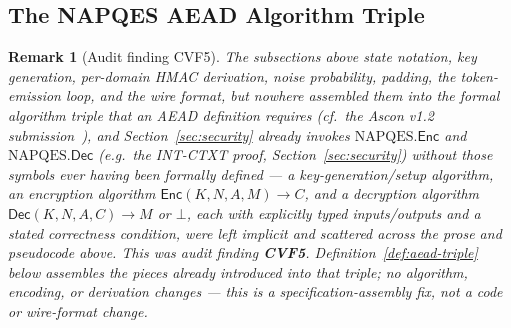 \documentclass[11pt,a4paper]{article}
\newtheorem{remark}[theorem]{Remark}
\begin{document}
\subsection{The NAPQES AEAD Algorithm Triple}
\label{sec:algorithm-triple}

\begin{remark}[Audit finding CVF5]
The subsections above state notation, key generation, per-domain HMAC
derivation, noise probability, padding, the token-emission loop, and the
wire format, but nowhere assembled them into the formal algorithm triple
that an AEAD definition requires (cf.\ the Ascon v1.2
submission~\cite{ascon2021}), and
Section~\ref{sec:security} already invokes $\mathrm{NAPQES}.\mathsf{Enc}$
and $\mathrm{NAPQES}.\mathsf{Dec}$ (e.g.\ the INT-CTXT proof,
Section~\ref{sec:security}) without those symbols ever having been formally
defined — a key-generation/setup algorithm, an encryption algorithm
$\mathsf{Enc}(K,N,A,M)\to C$, and a decryption algorithm
$\mathsf{Dec}(K,N,A,C)\to M$ or $\bot$, each with explicitly typed
inputs/outputs and a stated correctness condition, were left implicit and
scattered across the prose and pseudocode above. This was audit finding
\textbf{CVF5}. Definition~\ref{def:aead-triple} below assembles the pieces
already introduced into that triple; no algorithm, encoding, or derivation
changes — this is a specification-assembly fix, not a code or wire-format
change.
\end{remark}
\end{document}
